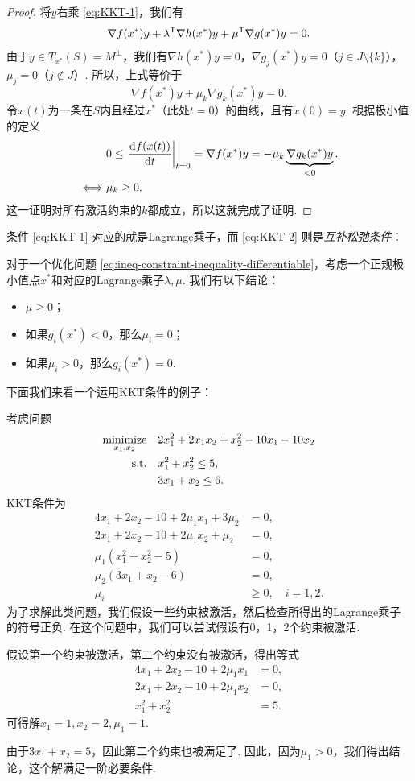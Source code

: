 \begin{proof}
将$y$右乘 \eqref{eq:KKT-1}，我们有
\[\nabla f(x^*)y+\lambda^{\mathsf{T}} \nabla h(x^*)y+\mu^{\mathsf{T}} \nabla g(x^*)y=0.\]
由于$y \in T_{x^*}(S)=M^\perp$，我们有$\nabla h(x^*) y = 0$，$\nabla g_j(x^*) y = 0$（$j \in J \setminus \{k\}$），$\mu_j=0$（$j \notin J$）. 所以，上式等价于
\[\nabla f(x^*)y+\mu_k\nabla g_k(x^*)y=0.\]
令$x(t)$为一条在$S$内且经过$x^*$（此处$t=0$）的曲线，且有$\dot{x}(0)={y}$. 根据极小值的定义
\begin{align*}
    &0\leq \left.\frac{\mathrm{d} f(x(t))}{\mathrm{d} t}\right|_{t=0}=\nabla f(x^*)y=-\mu_k\underbrace{\nabla g_k(x^*)y}_{<0}.\\
    \iff&\mu_k\geq 0.
\end{align*}
这一证明对所有激活约束的$k$都成立，所以这就完成了证明. 
\end{proof}

条件 \eqref{eq:KKT-1} 对应的就是Lagrange乘子，而 \eqref{eq:KKT-2} 则是\textit{互补松弛条件}：

\begin{proposition}[互补松弛条件]\label{prop:complementary-slackness}
    对于一个优化问题 \eqref{eq:ineq-constraint-inequality-differentiable}，考虑一个正规极小值点$x^*$和对应的Lagrange乘子$\lambda,\mu$. 我们有以下结论：
    \begin{itemize}
        \item $\mu\geq 0$；
        \item 如果$g_i(x^*)<0$，那么$\mu_i=0$；
        \item 如果$\mu_i>0$，那么$g_i(x^*)=0$.
    \end{itemize}
\end{proposition}

下面我们来看一个运用KKT条件的例子：
\begin{example}
考虑问题
\begin{align*}
    \operatorname*{minimize}_{x_1,x_2} \quad &2x_1^2+2x_1x_2+x_2^2-10x_1-10x_2 \\
    \text{s.t.}\quad &x_1^2+x_2^2\leq 5, \\
    & 3x_1+x_2\leq 6.
\end{align*}
KKT条件为
\begin{align*}
    4x_1+2x_2-10+2\mu_1x_1+3\mu_2&=0, \\
    2x_1+2x_2-10+2\mu_1x_2+\mu_2&=0, \\
    \mu_1(x_1^2+x_2^2-5)&=0, \\
    \mu_2(3x_1+x_2-6)&=0,\\
    \mu_i&\geq 0,\quad i=1,2.
\end{align*}
为了求解此类问题，我们假设一些约束被激活，然后检查所得出的Lagrange乘子的符号正负. 在这个问题中，我们可以尝试假设有0，1，2个约束被激活. 

假设第一个约束被激活，第二个约束没有被激活，得出等式
\begin{align*}
4x_1+2x_2-10+2\mu_1x_1&=0, \\
2x_1+2x_2-10+2\mu_1x_2&=0, \\
x_1^2+x_2^2&=5.
\end{align*}
可得解$x_1=1,x_2=2,\mu_1=1.$

由于$3x_1+x_2=5$，因此第二个约束也被满足了. 因此，因为$\mu_1 > 0$，我们得出结论，这个解满足一阶必要条件. 
\end{example}

